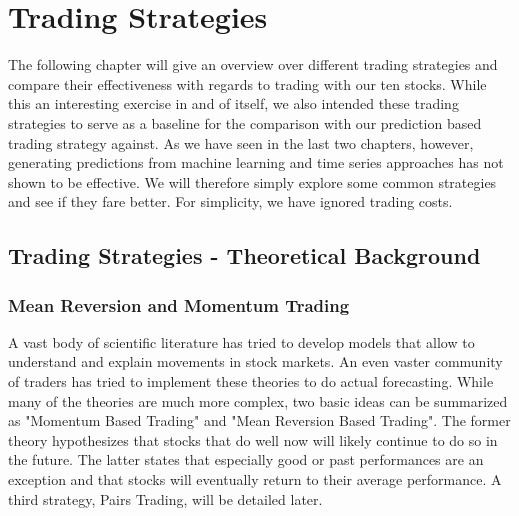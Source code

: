 \chapter{Trading Strategies}\label{ch:strategies}
The following chapter will give an overview over different trading strategies and compare their effectiveness with regards to trading with our ten stocks. While this an interesting exercise in and of itself, we also intended these trading strategies to serve as a baseline for the comparison with our prediction based trading strategy against. As we have seen in the last two chapters, however, generating predictions from machine learning and time series approaches has not shown to be effective. We will therefore simply explore some common strategies and see if they fare better. For simplicity, we have ignored trading costs. 


\section{Trading Strategies - Theoretical Background}

\subsection{Mean Reversion and Momentum Trading}
A vast body of scientific literature has tried to develop models that allow to understand and explain movements in stock markets. An even vaster community of traders has tried to implement these theories to do actual forecasting. While many of the theories are much more complex, two basic ideas can be summarized as "Momentum Based Trading" and "Mean Reversion Based Trading". The former theory hypothesizes that stocks that do well now will likely continue to do so in the future. The latter states that especially good or past performances are an exception and that stocks will eventually return to their average performance. A third strategy, Pairs Trading, will be detailed later. 


